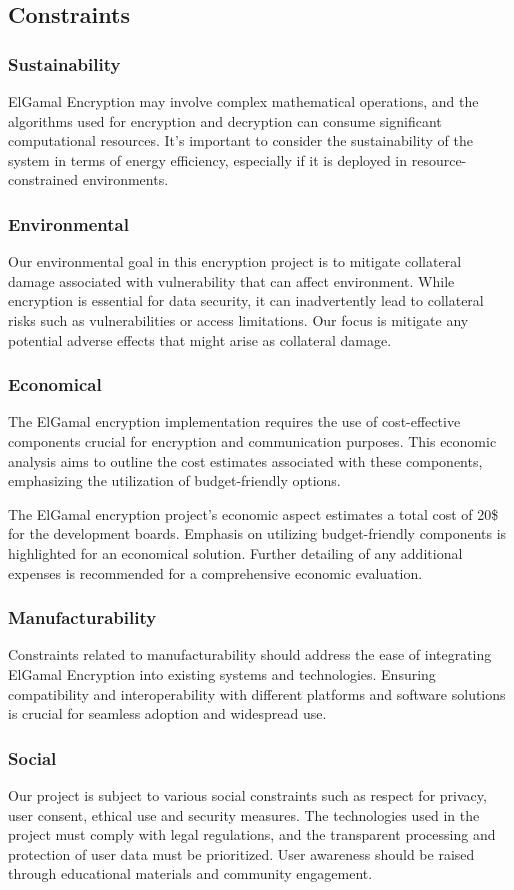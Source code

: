 \documentclass[12pt]{article}
\begin{document}
	\subsection{Constraints}
		\subsubsection{Sustainability}
		ElGamal Encryption may involve complex mathematical operations, and the algorithms used for encryption and decryption can consume significant computational resources. It's important to consider the sustainability of the system in terms of energy efficiency, especially if it is deployed in resource-constrained environments.
		\subsubsection{Environmental}
		Our environmental goal in this encryption project is to mitigate collateral damage associated with vulnerability that can affect environment. While encryption is essential for data security, it can inadvertently lead to collateral risks such as vulnerabilities or access limitations. Our focus is mitigate any potential adverse effects that might arise as collateral damage.
		\subsubsection{Economical}
		The ElGamal encryption implementation requires the use of cost-effective components crucial for encryption and communication purposes. This economic analysis aims to outline the cost estimates associated with these components, emphasizing the utilization of budget-friendly options.
			
		The ElGamal encryption project's economic aspect estimates a total cost of 20\$ for the development boards. Emphasis on utilizing budget-friendly components is highlighted for an economical solution. Further detailing of any additional expenses is recommended for a comprehensive economic evaluation.
		\subsubsection{Manufacturability}
	Constraints related to manufacturability should address the ease of integrating ElGamal Encryption into existing systems and technologies. Ensuring compatibility and interoperability with different platforms and software solutions is crucial for seamless adoption and widespread use.
		\subsubsection{Social}
  		Our project is subject to various social constraints such as respect for privacy, user consent, ethical use and security measures. The technologies used in the project must comply with legal regulations, and the transparent processing and protection of user data must be prioritized. User awareness should be raised through educational materials and community engagement.
\end{document}
